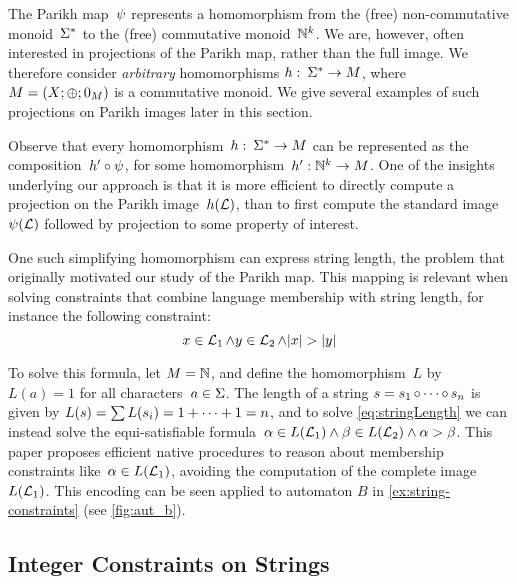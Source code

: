 The Parikh map~$\operatorname{\psi}$ represents a homomorphism from the (free)
non-commutative monoid~$\Sigma^*$ to the (free) commutative
monoid~$\mathbb{N}^k$. We are, however, often interested in projections of the
Parikh map, rather than the full image. We therefore consider \emph{arbitrary}
homomorphisms $h:\: \Sigma^* \to M$, where $M =
\left(X;\operatorname{\oplus};0_{M}\right)$ is a commutative monoid. We give several
examples of such projections on Parikh images later in this section.

Observe that every homomorphism~$h:\: \Sigma^* \to M$ can be
represented as the composition~$h' \circ \operatorname{\psi}$, for some
homomorphism~$h' : \mathbb{N}^k \to M$. One of the insights underlying our
approach is that it is more efficient to directly compute a
projection on the Parikh image~$h(\operatorname{\mathcal{L}})$, than to first compute the
standard image~$\operatorname{\psi}(\operatorname{\mathcal{L}})$ followed by projection to
some property of interest.


\begin{example}\label{ex:length}
One such simplifying homomorphism can express string
length, the problem that originally motivated our study of the Parikh
map. This mapping is relevant when solving constraints that combine
language membership with string length, for instance the following constraint:
\begin{equation}\label{eq:stringLength}
x \in \operatorname{\mathcal{L}}_1 \wedge y \in \operatorname{\mathcal{L}}_2 \wedge |x| > |y|
\end{equation}

To solve this formula, let
$M = \mathbb{N}$, and define the homomorphism~$L$ by $L(a) = 1$
for all characters~$a \in \Sigma$. The length of a string
$s = s_1 \operatorname{\circ} \cdots \operatorname{\circ} s_n$ is given by
$L(s) = \sum L(s_i) = 1 + \cdots + 1 = n$, and to solve
\eqref{eq:stringLength} we can instead solve the equi-satisfiable
formula~$\alpha \in L(\operatorname{\mathcal{L}}_1) \wedge \beta \in L(\operatorname{\mathcal{L}}_2)
\wedge \alpha > \beta$. This paper proposes efficient native
procedures to reason about membership constraints
like~$\alpha \in L(\operatorname{\mathcal{L}}_1)$, avoiding the computation of
the complete image~$L(\operatorname{\mathcal{L}}_1)$. This encoding can be seen applied to automaton $B$ in
\cref{ex:string-constraints} (see \cref{fig:aut_b}).
\end{example}

\subsection{Integer Constraints on Strings}\label{sec:parikh-automata}

